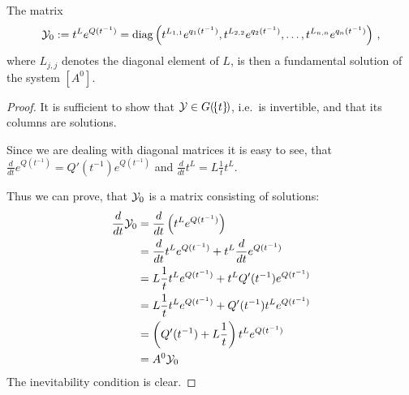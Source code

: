 \begin{lem}
  The matrix
  \[
    \mathcal{Y}_0:=t^Le^{Q(t^{-1})}=\operatorname{diag}\left(
      t^{L_{1,1}}e^{q_1(t^{-1})},
      t^{L_{2,2}}e^{q_2(t^{-1})},\dots,
      t^{L_{n,n}}e^{q_n(t^{-1})}
    \right) \,,
  \]
  where $L_{j,j}$ denotes the  diagonal element of $L$, is then
  a fundamental solution of the system $[A^0]$.
\end{lem}
\begin{proof}
  It is sufficient to show that $\mathcal{Y}\in G(\!\{t\}\!)$, i.e.\ is invertible, and
  that its columns are solutions.

  \begin{comment}
    Since we are dealing with diagonal matrices it is easy to see, that
    \begin{align*}
      \frac{d}{dt}e^{Q(t^{-1})}
      &=\diag\left(\frac{d}{dt}e^{q_1(t^{-1})},\frac{d}{dt}e^{q_2(t^{-1})}
        ,\dots,
        \frac{d}{dt}e^{q_n(t^{-1})}\right)
        \\&=\diag\left(\frac{d}{dt}q_1(t^{-1})e^{q_1(t^{-1})}
                      ,\frac{d}{dt}q_1(t^{-1})e^{q_2(t^{-1})}
                      ,\dots
                      ,\frac{d}{dt}q_1(t^{-1})e^{q_n(t^{-1})}\right)
    \\&=Q'(t^{-1})e^{Q(t^{-1})} \,.
    \end{align*}
    and, since the function $t^L$ is defined as $e^{L\ln t}$,
    \begin{align*}
      \frac{d}{dt}t^L&=\frac{d}{dt}e^{L\ln t}
      =Le^{(L-\id)\ln t}
      =L\frac{1}{t}t^L \,.
    \end{align*}
  \end{comment}
  Since we are dealing with diagonal matrices it is easy to see, that
  $\frac{d}{dt}e^{Q(t^{-1})}=Q'(t^{-1})e^{Q(t^{-1})}$ and
  $\frac{d}{dt}t^L=L\frac{1}{t}t^L$.

  Thus we can prove, that $\mathcal{Y}_0$ is a matrix consisting of solutions:
  \begin{align*}
    \frac{d}{dt}\mathcal{Y}_0
    &=\frac{d}{dt}\left(t^Le^{Q(t^{-1})}\right)
  \\&=\frac{d}{dt}t^Le^{Q(t^{-1})}+t^L\frac{d}{dt}e^{Q(t^{-1})}
  \\&=L\frac{1}{t}t^Le^{Q(t^{-1})}+t^LQ'(t^{-1})e^{Q(t^{-1})}
  \\&=L\frac{1}{t}t^Le^{Q(t^{-1})}+Q'(t^{-1})t^Le^{Q(t^{-1})}
  \\&=\left(Q'(t^{-1})+L\frac{1}{t}\right)t^Le^{Q(t^{-1})}
  \\&=A^0\mathcal{Y}_0
  \end{align*}
  The inevitability condition is clear.
\end{proof}
